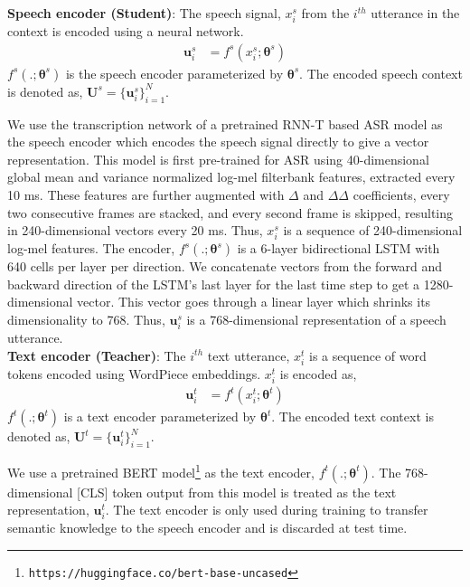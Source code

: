 \documentclass{article}
\begin{document}
\noindent \textbf{Speech encoder (Student)}: The speech signal, $x_i^s$ from the $i^{th}$ utterance in the context is encoded using a neural network.%
\begin{equation*}
    \begin{split}
        \textbf{u}_i^s &= f^s(x_i^s; \boldsymbol\theta^s)
    \end{split}
\end{equation*}
$f^s(.;\boldsymbol\theta^s)$ is the speech encoder parameterized by $\boldsymbol\theta^s$. The encoded speech context is denoted as, $\textbf{U}^s = \{\textbf{u}_i^s\}_{i=1}^{N}$. 

We use the transcription network of a pretrained RNN-T based ASR model \cite{saon2021advancing} as the speech encoder which encodes the speech signal directly to give a vector representation. This model is first pre-trained for ASR using 40-dimensional global mean and variance normalized log-mel filterbank features, extracted every 10 ms. These features are further augmented with $\Delta$ and $\Delta\Delta$ coefficients, every two consecutive frames are stacked, and every second frame is skipped, resulting in 240-dimensional vectors every 20 ms. Thus, $x_i^s$ is a sequence of 240-dimensional log-mel features. The encoder, $f^s(.;\boldsymbol\theta^s)$ is a 6-layer bidirectional LSTM with 640 cells per layer per direction. We concatenate vectors from the forward and backward direction of the LSTM's last layer for the last time step to get a 1280-dimensional vector. This vector goes through a linear layer which shrinks its dimensionality to 768. Thus, $\textbf{u}_i^s$ is a 768-dimensional representation of a speech utterance.\\

\noindent \textbf{Text encoder (Teacher)}: The $i^{th}$ text utterance, $x_i^t$ is a sequence of word tokens encoded using WordPiece embeddings. $x_i^t$ is encoded as,
\begin{equation*}
    \begin{split}
        \textbf{u}_i^t &= f^t(x_i^t; \boldsymbol\theta^t)
    \end{split}
\end{equation*}
$f^t(.;\boldsymbol\theta^t)$ is a text encoder parameterized by $\boldsymbol\theta^t$. The encoded text context is denoted as, $\textbf{U}^t = \{\textbf{u}_i^t\}_{i=1}^{N}$.

We use a pretrained BERT model\footnote{\texttt{https://huggingface.co/bert-base-uncased}} \cite{devlin2018bert} as the text encoder, $f^t(.;\boldsymbol\theta^t)$. The 768-dimensional [CLS] token output from this model is treated as the text representation, $\textbf{u}_i^t$. The text encoder is only used during training to transfer semantic knowledge to the speech encoder and is discarded at test time.\\
\end{document}

